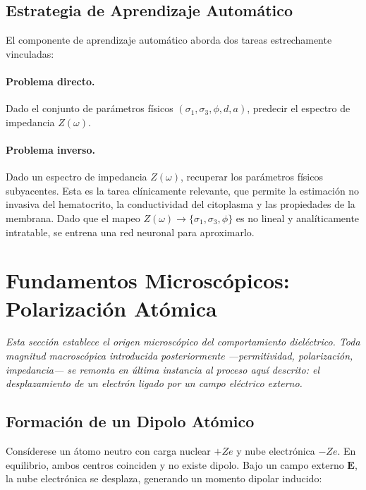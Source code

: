 \documentclass[12pt]{article}
\begin{document}
\subsection{Estrategia de Aprendizaje Autom\'atico}

El componente de aprendizaje autom\'atico aborda dos tareas estrechamente vinculadas:
\paragraph{Problema directo.} Dado el conjunto de par\'ametros f\'isicos
$(\sigma_1, \sigma_3, \phi, d, a)$, predecir el espectro de impedancia $Z(\omega)$.

\paragraph{Problema inverso.} Dado un espectro de impedancia $Z(\omega)$, recuperar los
par\'ametros f\'isicos subyacentes. Esta es la tarea cl\'inicamente relevante, que permite la
estimaci\'on no invasiva del hematocrito, la conductividad del citoplasma y las propiedades
de la membrana. Dado que el mapeo $Z(\omega) \to \{\sigma_1, \sigma_3, \phi\}$ es no lineal
y anal\'iticamente intratable, se entrena una red neuronal para aproximarlo.


\section{Fundamentos Microsc\'opicos: Polarizaci\'on At\'omica}

\label{sec:atomic}


\noindent\textit{Esta secci\'on establece el origen microsc\'opico del comportamiento
diel\'ectrico. Toda magnitud macrosc\'opica introducida posteriormente ---permitividad,
polarizaci\'on, impedancia--- se remonta en \'ultima instancia al proceso aqu\'i descrito: el
desplazamiento de un electr\'on ligado por un campo el\'ectrico externo.}

\subsection{Formaci\'on de un Dipolo At\'omico}

Cons\'iderese un \'atomo neutro con carga nuclear $+Ze$ y nube electr\'onica $-Ze$. En equilibrio,
ambos centros coinciden y no existe dipolo. Bajo un campo externo $\mathbf{E}$, la nube
electr\'onica se desplaza, generando un momento dipolar inducido:
\end{document}
